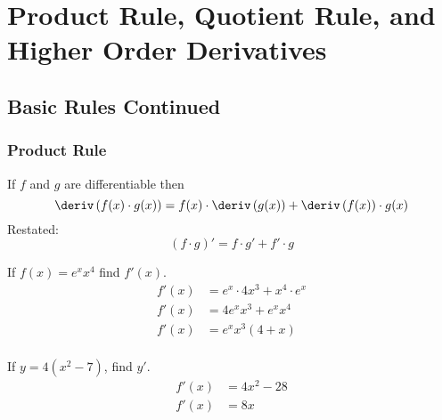 
\section{Product Rule, Quotient Rule, and Higher Order Derivatives}
\subsection{Basic Rules Continued}
\subsubsection{Product Rule}
\begin{theorem}
    If $f$ and $g$ are differentiable then
    \begin{equation}
        \deriv\left(f(x) \cdot g(x)\right) = f(x) \cdot \deriv \left(g(x)\right) + \deriv \left(f(x)\right) \cdot g(x)
    \end{equation}
    Restated:
    \begin{equation}
        \left(f \cdot g\right)' = f \cdot g' + f' \cdot g
    \end{equation}
\end{theorem}
\begin{example}
    If $f(x) = e^x x^4$ find $f'(x)$.
    \begin{align*}
        f'(x) &= e^x \cdot 4x^3 + x^4 \cdot e^x \\
        f'(x) &= 4e^x x^3 + e^x x^4 \\
        f'(x) &= e^x x^3(4 + x) \\
    \end{align*}
\end{example}
\begin{example}
    If $y=4(x^2 - 7)$, find $y'$.
    \begin{align*}
        f'(x) &= 4x^2 - 28 \\
        f'(x) &= 8x
    \end{align*}
\end{example}
